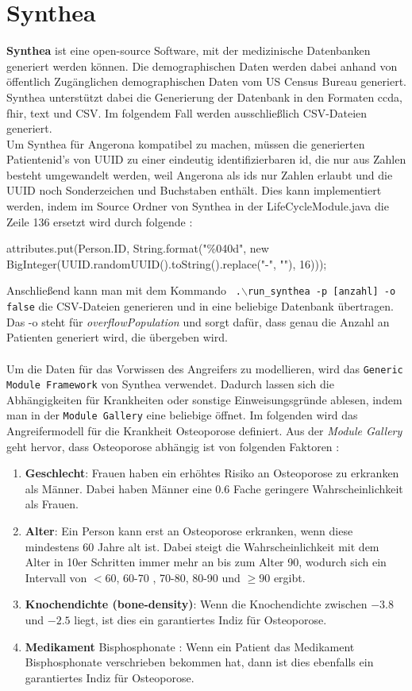 \documentclass[german,version-2020-11]{uzl-thesis}
\begin{document}
\section{Synthea}
\textbf{Synthea} \cite{19,20} ist eine open-source Software, mit der medizinische Datenbanken generiert werden können. Die demographischen Daten werden dabei anhand von öffentlich Zugänglichen demographischen Daten vom US Census Bureau \cite{21} generiert. Synthea unterstützt dabei die Generierung der Datenbank in den Formaten ccda, fhir, text und CSV. Im folgendem Fall werden ausschließlich CSV-Dateien generiert.\\  Um Synthea für Angerona kompatibel zu machen, müssen die generierten Patientenid's von UUID zu einer eindeutig identifizierbaren id, die nur aus Zahlen besteht umgewandelt werden, weil Angerona als ids nur Zahlen erlaubt und die UUID noch Sonderzeichen und Buchstaben enthält. Dies kann implementiert werden, indem im Source Ordner von Synthea in der LifeCycleModule.java die Zeile 136 ersetzt wird durch folgende : 
\begin{Java}
    attributes.put(Person.ID, String.format("\%040d", new BigInteger(UUID.randomUUID().toString().replace("-", ""), 16)));
\end{Java}
Anschließend kann man mit dem Kommando \texttt{ .$\backslash$run\_synthea -p [anzahl] -o false} die CSV-Dateien generieren und in eine beliebige Datenbank übertragen. Das -o steht für \textit{\textit{overflowPopulation}} und sorgt dafür, dass genau die Anzahl an Patienten generiert wird, die übergeben wird. \\ \\
Um die Daten für das Vorwissen des Angreifers zu modellieren, wird das \texttt{Generic Module Framework} von Synthea verwendet. Dadurch lassen sich die Abhängigkeiten für Krankheiten oder sonstige  Einweisungsgründe ablesen, indem man in der \texttt{Module Gallery}\cite{22} eine beliebige öffnet. Im folgenden  wird das Angreifermodell für die Krankheit Osteoporose definiert.  
Aus der \textit{Module Gallery} geht hervor, dass Osteoporose abhängig ist von folgenden Faktoren : 
\begin{enumerate}
	\item \textbf{Geschlecht}: Frauen haben ein erhöhtes Risiko an Osteoporose zu erkranken als Männer. Dabei haben Männer eine $0.6$ Fache geringere Wahrscheinlichkeit als Frauen.
	\item \textbf{Alter}: Ein Person kann erst an Osteoporose erkranken, wenn diese mindestens 60 Jahre alt ist. Dabei steigt die Wahrscheinlichkeit mit dem Alter in 10er Schritten immer mehr an bis zum Alter 90, wodurch sich ein Intervall von $<60$, 60-70 , 70-80, 80-90 und $\geq 90$ ergibt.
	\item \textbf{Knochendichte (bone-density)}: Wenn die Knochendichte zwischen $-3.8$ und $-2.5$ liegt, ist dies ein garantiertes Indiz für Osteoporose.
	\item \textbf{Medikament} Bisphosphonate : Wenn ein Patient das Medikament Bisphosphonate verschrieben bekommen hat, dann ist dies ebenfalls ein garantiertes Indiz für Osteoporose.
\end{enumerate} 
\end{document}
